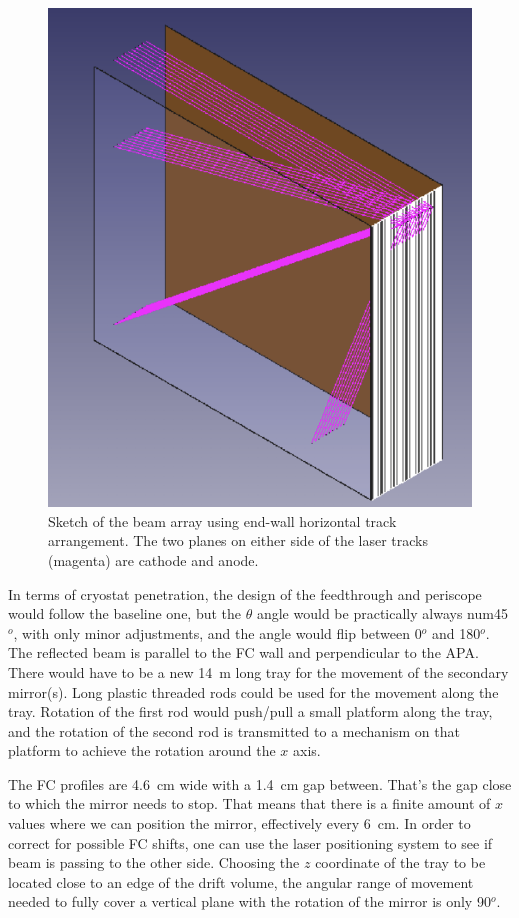 \begin{figure}[htb!] 
\centering 
\includegraphics[width=0.5\linewidth]{graphics/Laser_alternative2.png}
\caption{Sketch of the beam array using end-wall horizontal track arrangement. The two planes on either side of the laser tracks (magenta) are cathode and anode.}
\label{fig:laser_alter2} 
\end{figure} 

In terms of cryostat penetration, the design of the feedthrough and periscope would follow the baseline one, but the $\theta$ angle would be practically always num{45}$^{o}$, with only minor adjustments, and the angle would flip between 0$^{o}$ and 180$^{o}$. 
The reflected beam is parallel to the FC wall and perpendicular to the APA. There would have to be a new \num{14}~m long tray for the movement of the secondary mirror(s). 
Long plastic threaded rods could be used for the movement along the tray. Rotation of the first rod would push/pull a small platform along the tray, and the rotation of the second rod is transmitted to a mechanism on that platform to achieve the rotation around the $x$ axis.

The FC profiles are 4.6~cm wide with a 1.4~cm gap between. That's the gap close to which the mirror needs to stop. That means that there is a finite amount of $x$ values where we can position the mirror, effectively every 6~cm. In order to correct for possible FC shifts, one can use the laser positioning system to see if beam is passing to the other side. Choosing the $z$ coordinate of the tray to be located close to an edge of the drift volume, the angular range of movement needed to fully cover a vertical plane with the rotation of the mirror is only 90$^{o}$.

